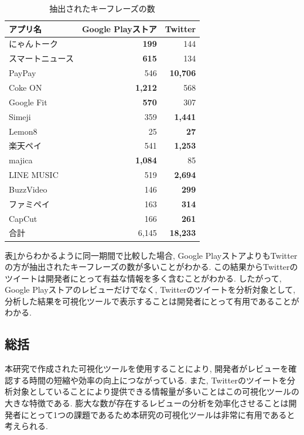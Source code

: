 \begin{table}[H]
  \small
  \caption{抽出されたキーフレーズの数}
  \label{tb:app_count}
  \begin{center}
  \begin{tabularx}{\linewidth}{X|r|r}
    \hline
    アプリ名&Google Playストア&Twitter\\\hline\hline
    にゃんトーク&\textbf{199}&144\\\hline
    スマートニュース&\textbf{615}&134\\\hline
    PayPay&546&\textbf{10,706}\\\hline
    Coke ON&\textbf{1,212}&568\\\hline
    Google Fit&\textbf{570}&307\\\hline
    Simeji&359&\textbf{1,441}\\\hline
    Lemon8&25&\textbf{27}\\\hline
    楽天ペイ&541&\textbf{1,253}\\\hline
    majica&\textbf{1,084}&85\\\hline
    LINE MUSIC&519&\textbf{2,694}\\\hline
    BuzzVideo&146&\textbf{299}\\\hline
    ファミペイ&163&\textbf{314}\\\hline
    CapCut&166&\textbf{261}\\\hline\hline
    合計&6,145&\textbf{18,233}\\\hline
  \end{tabularx}\end{center}
\end{table}

\noindent
表\ref{tb:app_count}からわかるように同一期間で比較した場合, Google PlayストアよりもTwitterの方が抽出されたキーフレーズの数が多いことがわかる. 
この結果からTwitterのツイートは開発者にとって有益な情報を多く含むことがわかる. したがって, Google Playストアのレビューだけでなく, Twitterのツイートを分析対象として, 分析した結果を可視化ツールで表示することは開発者にとって有用であることがわかる. 

\subsection{総括}
本研究で作成された可視化ツールを使用することにより, 開発者がレビューを確認する時間の短縮や効率の向上につながっている. また, Twitterのツイートを分析対象としていることにより提供できる情報量が多いことはこの可視化ツールの大きな特徴である. 
膨大な数が存在するレビューの分析を効率化させることは開発者にとって1つの課題であるため本研究の可視化ツールは非常に有用であると考えられる. 

